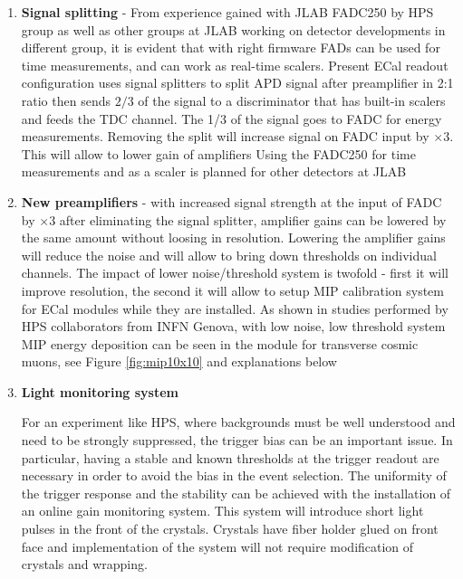 \begin{enumerate}
\item {\bf Signal splitting} - From experience gained with JLAB FADC250 by HPS group as well as other groups at JLAB working on detector developments in different group, it is evident that with right firmware FADs can be used for time measurements, and can work as real-time scalers. Present ECal readout configuration uses signal splitters to split APD signal after preamplifier in 2:1 ratio then sends $2/3$ of the signal to a discriminator that has built-in scalers and feeds the TDC channel. The 1/3 of the signal goes to FADC for energy measurements. Removing the split will increase signal on FADC input by $\times 3$. This will allow to lower gain of amplifiers Using the FADC250 for time measurements and as a scaler is planned for other detectors at JLAB 
 
\item {\bf New preamplifiers} - with increased signal strength at the input of FADC by $\times 3$ after eliminating the signal splitter, amplifier gains can be lowered by the same amount without loosing in resolution. Lowering the amplifier gains will reduce the noise and will allow to bring down thresholds on individual channels. The impact of lower noise/threshold system is twofold - first it will improve resolution, the second it will allow to setup MIP calibration system for ECal modules while they are installed. As shown in studies performed by HPS collaborators from INFN Genova, with low noise, low threshold system MIP energy deposition can be seen in the module for transverse cosmic muons, see Figure \ref{fig:mip10x10} and explanations below

\item {\bf Light monitoring system}

For an experiment like HPS, where backgrounds must be well understood and need to be strongly suppressed, the trigger bias can be an important issue. In particular, having a stable and known thresholds at the trigger readout are necessary in order to avoid the bias in the event selection. The uniformity of the trigger response and the stability can be achieved with the installation of an online gain monitoring system. This system will introduce short light pulses in the front of the crystals. Crystals have fiber holder glued on front face and implementation of the system will not require modification of crystals and wrapping. 


\end{enumerate}
